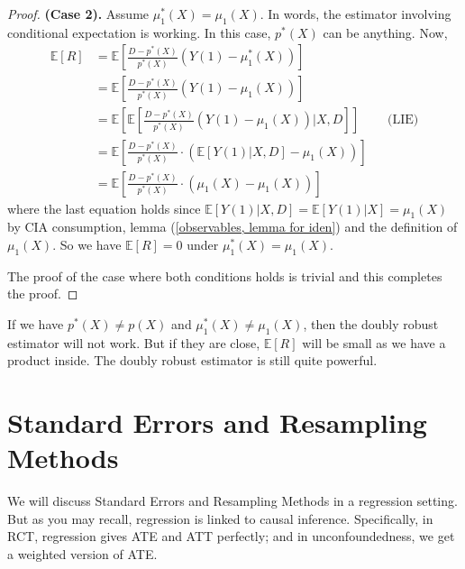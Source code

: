 \documentclass[11pt,a4paper]{amsart}
\theoremstyle{plain}
\theoremstyle{definition}
\begin{document}
\begin{proof}
	\textbf{(Case 2).} Assume $\mu_{1}^{*}(X) = \mu_{1}(X)$. In words, the estimator involving conditional expectation is working. In this case, $p^{*}(X)$ can be anything. Now, 
	\[	 \begin{aligned}
	\mathbb{E}[R]  &= \mathbb{E}\left[\frac{ D-p^{*}(X)}{p^{*}(X)} \left(Y(1)-\mu_{1}^{*}(X)\right)  \right]	\\
	&= \mathbb{E}\left[\frac{ D-p^{*}(X)}{p^{*}(X)} \left(Y(1)-\mu_{1}(X)\right)  \right] \\
	&= \mathbb{E}\left[\mathbb{E}\left[\frac{ D-p^{*}(X)}{p^{*}(X)} \left(Y(1)-\mu_{1}(X)\right) \big| X, D\right]  \right] &&\text{(LIE)} \\
	&= \mathbb{E}\left[ \frac{ D-p^{*}(X)}{p^{*}(X)} \cdot \left(\mathbb{E}\left[ Y(1) \big| X, D\right] - \mu_{1}(X)\right)  \right] \\
	&=\mathbb{E}\left[ \frac{ D-p^{*}(X)}{p^{*}(X)} \cdot \left(\mu_{1}(X) - \mu_{1}(X)\right)  \right] 
	\end{aligned} \]
	where the last equation holds since $ \mathbb{E}\left[ Y(1) \big| X, D\right] = \mathbb{E}\left[ Y(1) \big| X\right] = \mu_{1}(X)$ by CIA consumption, lemma (\ref{observables, lemma for iden}) and the definition of $\mu_{1}(X)$. So we have $	\mathbb{E}[R]  = 0$ under $\mu_{1}^{*}(X) = \mu_{1}(X)$.\par 
	The proof of the case where both conditions holds is trivial and this completes the proof.
	
	\end{proof}
	If we have $p^{*}(X) \ne p(X)$ and $\mu_{1}^{*}(X) \ne \mu_{1}(X)$, then the doubly robust estimator will not work. But if they are close, $\mathbb{E}[R]$ will be small as we have a product inside. The doubly robust estimator is still quite powerful.
	
\section{Standard Errors and Resampling Methods}
	We will discuss Standard Errors and Resampling Methods in a regression setting. But as you may recall, regression is linked to causal inference. Specifically, in RCT, regression gives ATE and ATT perfectly; and in unconfoundedness, we get a weighted version of ATE. 
	
\end{document}
